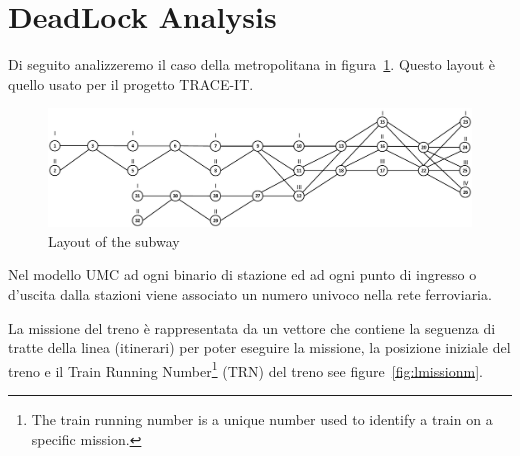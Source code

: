 \documentclass{ewic}
\begin{document}
			\section{DeadLock Analysis}
Di seguito analizzeremo il caso della metropolitana in figura~\ref{fig:example}. 
Questo layout è quello usato per il progetto TRACE-IT.

			\begin{figure}[htp]
				\begin{centering}	
				\includegraphics[scale=0.5]{img/esempioG}
				\caption{Layout of the subway}
				\label{fig:example}
				\end{centering}
			\end{figure}

		
			Nel modello UMC ad ogni binario di stazione ed ad ogni punto di ingresso o d'uscita dalla stazioni viene associato un numero univoco nella rete ferroviaria.
			
			La missione del treno è rappresentata da un vettore che contiene la seguenza di tratte della linea (itinerari) per poter eseguire la missione, la posizione iniziale del treno e il Train Running Number\footnote{The train running number is a unique number used to identify a train on a specific mission.} (TRN) del treno see figure~\ref{fig:lmissionm}.
			
\end{document}

